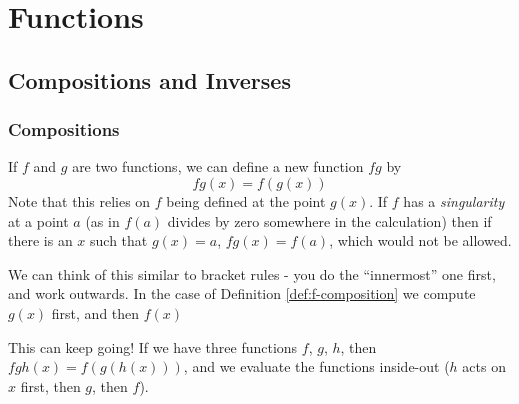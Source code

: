 \section{Functions}
\subsection{Compositions and Inverses}
\subsubsection{Compositions}
\begin{definition} \label{def:f-composition}
If $f$ and $g$ are two functions, we can define a new function $fg$ by 
\[ fg(x) = f(g(x)) \]
Note that this relies on $f$ being defined at the point $g(x)$. If $f$ has a \emph{singularity} at a point $a$ (as in $f(a)$ divides by zero somewhere in the calculation) then if there is an $x$ such that $g(x) = a$, $fg(x) = f(a)$, which would not be allowed.
\end{definition}

We can think of this similar to bracket rules - you do the ``innermost'' one first, and work outwards. 
In the case of Definition \ref{def:f-composition} we compute $g(x)$ first, and then $f(x)$

This can keep going! If we have three functions $f$, $g$, $h$, then $fgh(x) = f(g(h(x)))$, and we evaluate the functions inside-out ($h$ acts on $x$ first, then $g$, then $f$).

